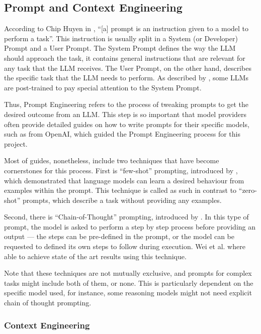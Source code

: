 \documentclass[a4paper]{report}
\begin{document}
\subsection{Prompt and Context Engineering}
\label{sec:prompt-enginering}

According to Chip Huyen in \cite{aiebook2025}, ``[a] prompt is an instruction given to a model to perform a task''. This instruction is usually split in a System (or Developer) Prompt and a User Prompt. The System Prompt defines the way the LLM should approach the task, it contains general instructions that are relevant for any task that the LLM receives. The User Prompt, on the other hand, describes the specific task that the LLM needs to perform. As described by \cite{wallace2024instructionhierarchytrainingllms}, some LLMs are post-trained to pay special attention to the System Prompt.

Thus, Prompt Engineering refers to the process of tweaking prompts to get the desired outcome from an LLM. This step is so important that model providers often provide detailed guides on how to write prompts for their specific models, such as \cite{openai2025promptengineering} from OpenAI, which guided the Prompt Engineering process for this project.

Most of guides, nonetheless, include two techniques that have become cornerstones for this process. First is ``few-shot'' prompting, introduced by \cite{brown2020languagemodelsfewshotlearners}, which demonstrated that language models can learn a desired behaviour from examples within the prompt. This technique is called as such in contrast to ``zero-shot'' prompts, which describe a task without providing any examples.

Second, there is ``Chain-of-Thought'' prompting, introduced by \cite{wei2023chainofthoughtpromptingelicitsreasoning}. In this type of prompt, the model is asked to perform a step by step process before providing an output --- the steps can be pre-defined in the prompt, or the model can be requested to defined its own steps to follow during execution. Wei et al. where able to achieve state of the art results using this technique.

Note that these techniques are not mutually exclusive, and prompts for complex tasks might include both of them, or none. This is particularly dependent on the specific model used, for instance, some reasoning models might not need explicit chain of thought prompting.

\subsubsection{Context Engineering}
\end{document}
